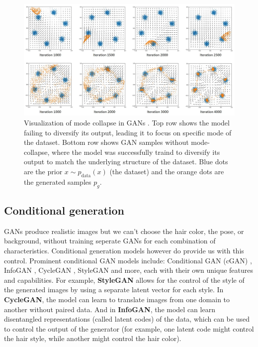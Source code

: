 \begin{figure}
    \centering
    \includegraphics[width=\textwidth]{images/gan/gan_mode_collapse.png}
    \caption{Visualization of mode collapse in GANs \cite{gan_mode_collapse_image_source}. Top row shows the model failing to diversify its output, leading it to focus on specific mode of the dataset. Bottom row shows GAN samples without mode-collapse, where the model was successfully traind to diversify its output to match the underlying structure of the dataset. Blue dots are the prior $x \sim p_{\text{data}}(x)$ (the dataset) and the orange dots are the generated samples $p_g$.}
    \label{fig:gan_mode_collapse}
\end{figure}




\subsection{Conditional generation}
\label{subsec:gan_conditional_generation}

GANs produce realistic images but we can't choose the hair color, the pose, or background, without training seperate GANs for each combination of characteristics. Conditional generation models however do provide us with this control. Prominent conditional GAN models include: Conditional GAN (cGAN) \cite{cgan}, InfoGAN \cite{infogan}, CycleGAN \cite{cyclegan}, StyleGAN \cite{stylegan} and more, each with their own unique features and capabilities. For example, \textbf{StyleGAN} allows for the control of the style of the generated images by using a separate latent vector for each style. In \textbf{CycleGAN}, the model can learn to translate images from one domain to another without paired data. And in \textbf{InfoGAN}, the model can learn disentangled representations (called latent codes) of the data, which can be used to control the output of the generator (for example, one latent code might control the hair style, while another might control the hair color).

